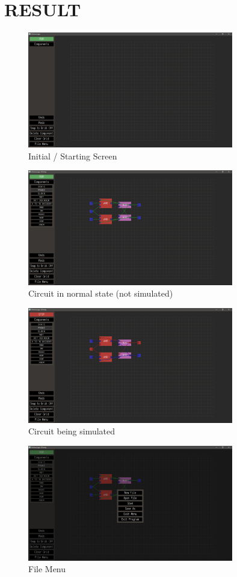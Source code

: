 \documentclass[report]{subfiles}
\begin{document}
\chapter{RESULT}
\begin{figure}[H]
    \centering
    \includegraphics[width=0.8\textwidth]{graphics/initial_screen.png}
    \caption{Initial / Starting Screen}
\end{figure}
\begin{figure}[H]
    \centering
    \includegraphics[width=0.8\textwidth]{graphics/jkff_normal.png}
    \caption{Circuit in normal state (not simulated)}
\end{figure}
\begin{figure}[H]
    \centering
    \includegraphics[width=0.8\textwidth]{graphics/jkff_simulating.png}
    \caption{Circuit being simulated}
\end{figure}
\begin{figure}[H]
    \centering
    \includegraphics[width=0.8\textwidth]{graphics/file_menu.png}
    \caption{File Menu}
\end{figure}
\end{document}
